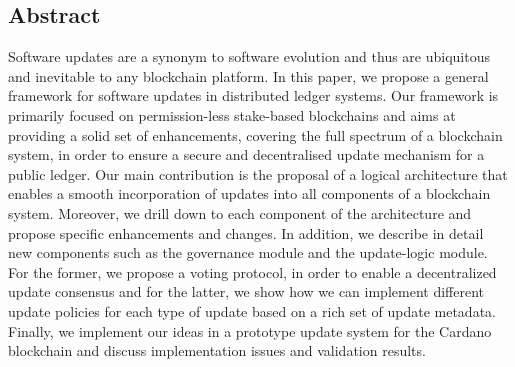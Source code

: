 \subsection*{Abstract}
Software updates are a synonym to software evolution and thus are ubiquitous and inevitable to any blockchain platform. In this paper, we propose a general framework for software updates in distributed ledger systems. Our framework is primarily focused on permission-less stake-based blockchains and aims at providing a solid set of enhancements, covering the full spectrum of a blockchain system, in order to ensure a secure and decentralised update mechanism for a public ledger. Our main contribution is the proposal of a logical architecture that enables a smooth incorporation of updates into all components of a blockchain system. Moreover, we drill down to each component of the architecture and propose specific enhancements and changes. In addition, we describe in detail new components such as the governance module and the update-logic module. For the former, we propose a voting protocol, in order to enable a decentralized update consensus and for the latter, we show how we can implement different update policies for each type of update based on a rich set of update metadata. Finally, we implement our ideas in a prototype update system for the Cardano blockchain and discuss implementation issues and validation results.
